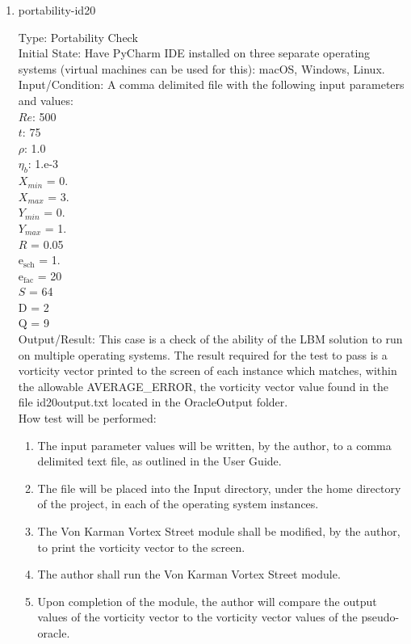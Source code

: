 \documentclass[12pt, titlepage]{article}
\begin{document}
\begin{enumerate}

\item{portability-id20\\}

Type: Portability Check\\
					
Initial State: Have PyCharm IDE installed on three separate operating systems (virtual machines can be used for this): macOS, Windows, Linux. \\
					
Input/Condition: A comma delimited file with the following input parameters and values:\\
$Re$: 500\\
$t$: 75\\
$\rho$: 1.0\\
$\eta_b$: 1.e-3\\
$X_{min}$ = 0.\\
$X_{max}$ = 3.\\
$Y_{min}$ = 0.\\
$Y_{max}$ = 1.\\
$R$ = 0.05\\
$\mathrm{e_{sch}}$ = 1.\\
$\mathrm{e_{fac}}$ = 20\\
$S$ = 64\\
$\mathrm{D}$ = 2\\
$\mathrm{Q}$ = 9\\

					
Output/Result: This case is a check of the ability of the LBM solution to run on multiple operating systems. The result required for the test to pass is a vorticity vector printed to the screen of each instance which matches, within the allowable AVERAGE\_ERROR, the vorticity vector value found in the file id20output.txt located in the OracleOutput folder.\\
					
How test will be performed: 

\begin{enumerate}

\item The input parameter values will be written, by the author, to a comma delimited text file, as outlined in the User Guide.
\item The file will be placed into the Input directory, under the home directory of the project, in each of the operating system instances.
\item The Von Karman Vortex Street module shall be modified, by the author, to print the vorticity vector to the screen.
\item The author shall run the Von Karman Vortex Street module.
\item Upon completion of the module, the author will compare the output values of the vorticity vector to the vorticity vector values of the pseudo-oracle.\\
\end{enumerate}

\end{enumerate}
\end{document}
